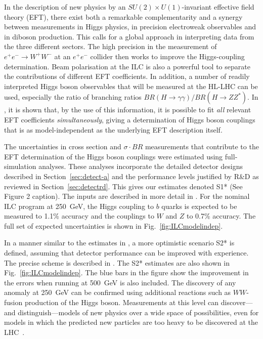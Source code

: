 \documentclass[%
 reprint,
 floatfix,
 amsmath,amssymb,
 aps,
]{revtex4-1}
\begin{document}
In the description of new physics by an $SU(2)\times U(1)$-invariant effective field theory (EFT), there exist both a remarkable complementarity and a synergy between measurements in Higgs physics, in precision electroweak observables and in diboson production. This calls for a global approach in interpreting data from the three different sectors. The high precision in  the measurement of $e^+e^- \to W^+W^-$ at an $e^+e^-$ collider then works to improve the Higgs-coupling determination. Beam polarisation at the ILC is also a powerful tool
to separate the contributions of different EFT
coefficients.  In addition, a number of readily interpreted Higgs boson observables that will be measured at the HL-LHC can be used, especially the 
ratio of branching ratios  $BR(H\to \gamma\gamma)/BR(H\to ZZ^*)$. 
  In \cite{Barklow:2017suo}, it is shown that, by the use of this information, 
  it is possible to fit {\it all}
relevant EFT
coefficients  {\it simultaneously}, giving a 
determination of Higgs boson couplings that is as
model-independent as the underlying EFT description itself. 

 
The uncertainties in  cross section and $\sigma\cdot BR$ measurements that contribute to the EFT determination of the Higgs boson couplings were estimated using full-simulation analyses.  These analyses incorporate the detailed detector designs described in Section~\ref{sec:detect-a}
and the performance levels justified by R\&D as reviewed in Section~\ref{sec:detectrd}.
This gives our estimates denoted S1* (See Figure 2 caption).  The inputs are described in more detail in \cite{ILCforESS}. 
For the nominal ILC program at 250~GeV, the Higgs
coupling to $b$ quarks is expected to be measured to 1.1\% accuracy and the
couplings to $W$ and $Z$ to 0.7\% accuracy. 
The full set  of  expected
uncertainties  is shown in Fig.~\ref{fig:ILCmodelindep}. 

In a manner similar to the estimates in \cite{Yellow}, a more optimistic scenario S2* is defined, assuming that detector performance can be improved with experience.   The precise scheme is described in \cite{ILCforESS}.   The S2* estimates are also shown in Fig.~\ref{fig:ILCmodelindep}.   The blue bars in the figure show the improvement in the errors when running at 500~GeV is also included.    The 
discovery of any anomaly at 250~GeV can be confirmed 
using additional reactions  such as $WW$-fusion production of the
Higgs boson.   Measurements at this
level can discover---and distinguish---models of new physics over a
wide space of possibilities, even for models in which the predicted new
particles are too heavy to be discovered at the
LHC~\cite{Barklow:2017suo}.
\end{document}

